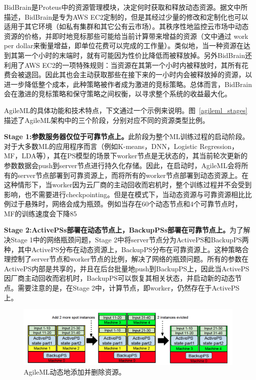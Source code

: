 BidBrain是Proteus中的资源管理模块，决定何时获取和释放动态资源。据文中所描述，BidBrain是专为AWS EC2定制的，但是其经过少量的修改和定制化也可以适用于其它环境（如私有集群和其它公有云市场）。其秩序性地监控云市场中动态资源的价格，并即时地竞标那些可能给当前计算带来增益的资源（文中通过 work per dollar来衡量增益，即单位花费可以完成的工作量）。类似地，当一种资源在达到其第一个小时的末端时，就有可能因为性价比降低而被释放掉。另外BidBrain还利用了AWS EC2的一项特殊规则：当资源在其第一个小时内被释放时，其所有花费会被退回。因此其也会主动获取那些在接下来的一小时内会被释放掉的资源，以进一步降低整个成本，此种策略被作者成为激进的竞标策略。总体而言，BidBrain会在激进的竞标策略和保守策略之间权衡，以寻求整个系统的收益最大化。

AgileML的具体功能和技术特点，下文通过一个示例来说明。图~\ref{agileml_stages}描述了AgileML架构中的三个阶段，分别对应不同的资源类型比例。

\textbf{Stage 1:参数服务器仅位于可靠节点上。}此阶段为整个ML训练过程的启动阶段。对于大多数ML的应用程序而言（例如K-means，DNN，Logistic Regression，MF，LDA等），其在PS模型的场景下worker节点是无状态的，其当前轮次更新的参数数据会push到server节点进行持久化存储。因此，在启动时，AgileML会将所有的server节点部署到可靠资源上，而将所有的worker节点部署到动态资源上。在这种情形下，当worker因为云厂商的主动回收而宕机时，整个训练过程并不会受到影响，也不需要进行checkpointing。但是在模式下，当动态资源与可靠资源相比比例过于悬殊时，网络会成为瓶颈。例如当存在60个动态节点和4个可靠节点时，MF的训练速度会下降85%

\textbf{Stage 2:ActivePSs部署在动态节点上，BackupPSs部署在可靠节点上。}为了解决Stage 1中的网络瓶颈问题，Stage 2中将server节点分为ActivePS和BackupPS两种，其中ActivePS分布在动态资源上，BackupPS分布在可靠资源上。这种策略合理控制了server节点和worker节点的比例，解决了网络的瓶颈问题。所有的参数在ActivePS内部是共享的，并且在后台批量地push到BackupPS上，因此当ActivePS因厂商主动回收而宕机时，BackupPS可以恢复其相关状态，并启动新的动态节点。需要注意的是，在Stage 2中，计算节点，即worker，仍然存在于ActivePS上。

\begin{figure}[h]
    \centerline{\includegraphics[width=\textwidth]{figures/stage-trans.png}}
    \caption{AgileML动态地添加并删除资源。}
    \label{stage_trans}
\end{figure}

